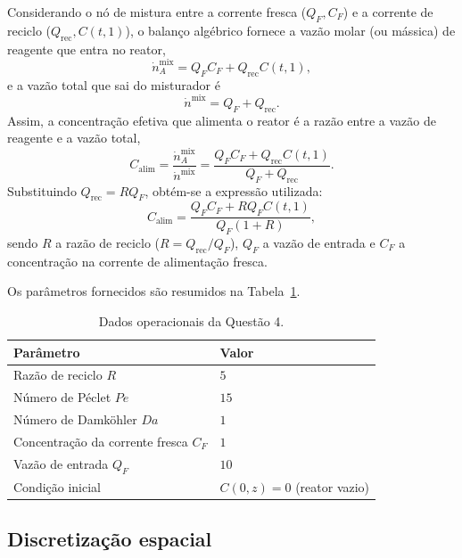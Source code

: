 \documentclass{article}
\begin{document}
Considerando o nó de mistura entre a corrente fresca ($Q_F, C_F$) e a corrente de reciclo ($Q_{\text{rec}}, C(t,1)$), o balanço algébrico fornece a vazão molar (ou mássica) de reagente que entra no reator,
\begin{equation}
  \dot{n}_A^{\text{mix}} = Q_F C_F + Q_{\text{rec}} C(t,1),
\end{equation}
e a vazão total que sai do misturador é
\begin{equation}
  \dot{n}^{\text{mix}} = Q_F + Q_{\text{rec}}.
\end{equation}
Assim, a concentração efetiva que alimenta o reator é a razão entre a vazão de reagente e a vazão total,
\begin{equation}
  C_{\text{alim}} = \frac{\dot{n}_A^{\text{mix}}}{\dot{n}^{\text{mix}}} = \frac{Q_F C_F + Q_{\text{rec}} C(t,1)}{Q_F + Q_{\text{rec}}}.
\end{equation}
Substituindo $Q_{\text{rec}} = R Q_F$, obtém-se a expressão utilizada:
\begin{equation}
  C_{\text{alim}} = \frac{Q_F C_F + R Q_F C(t,1)}{Q_F (1 + R)}, \label{eq:calim-q4}
\end{equation}
 sendo $R$ a razão de reciclo ($R = Q_{\text{rec}}/Q_F$), $Q_F$ a vazão de entrada e $C_F$ a concentração na corrente de alimentação fresca.

Os parâmetros fornecidos são resumidos na Tabela~\ref{tab:dados-q4}.

\begin{table}[ht]
  \centering
  \begin{tabular}{ll}
    \hline
    \textbf{Parâmetro} & \textbf{Valor} \\
    \hline
    Razão de reciclo $R$ & $5$ \\
    Número de Péclet $Pe$ & $15$ \\
    Número de Damköhler $Da$ & $1$ \\
    Concentração da corrente fresca $C_F$ & $1$ \\
    Vazão de entrada $Q_F$ & $10$ \\
    Condição inicial & $C(0,z) = 0$ (reator vazio) \\
    \hline
  \end{tabular}
  \caption{Dados operacionais da Questão 4.}
  \label{tab:dados-q4}
\end{table}

\subsection*{Discretização espacial}
\end{document}
